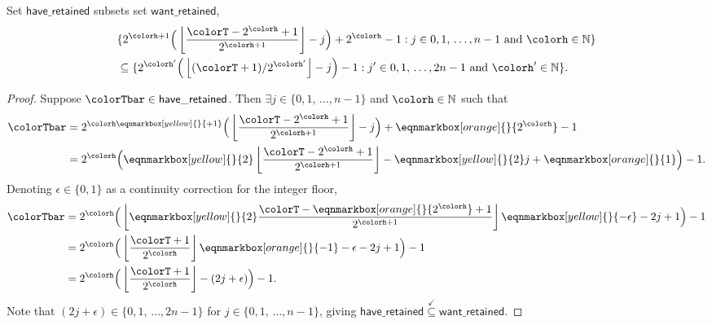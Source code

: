 \begin{sublemma}
\label{thm:tilted-rsubset}
Set $\mathsf{have\_retained}$ subsets set $\mathsf{want\_retained}$,
\begin{align*}
&\{
  2^{\colorh + 1}\Big( \left\lfloor\frac{\colorT - 2^{\colorh} + 1}{2^{\colorh + 1}} \right\rfloor - j\Big) + 2^{\colorh} - 1
  :
  j \in 0,1,\,\ldots,n-1
  \text{ and }
  \colorh \in \mathbb{N}
\}\\
&\subseteq
\{
  2^{\colorh'}\Big(\left\lfloor (\colorT + 1) / 2^{\colorh'} \right\rfloor - j\Big) - 1
  :
  j' \in 0,1,\,\ldots,2n-1
  \text{ and }
  \colorh' \in \mathbb{N}
\}.
\end{align*}
\end{sublemma}
\begin{proof}
Suppose $\colorTbar \in \mathsf{have\_retained}$.
Then $\exists j \in \{0,1,\,\ldots,n-1\}$ and $\colorh \in \mathbb{N}$ such that
\begin{align*}
\colorTbar
&= 2^{\colorh \eqnmarkbox[yellow]{}{+ 1}}\Big(\left\lfloor \frac{\colorT - 2^{\colorh} + 1}{2^{\colorh + 1}} \right\rfloor - j \Big) + \eqnmarkbox[orange]{}{2^{\colorh}} - 1\\
&= 2^{\colorh} \Big(\eqnmarkbox[yellow]{}{2}\left\lfloor \frac{\colorT - 2^{\colorh} + 1}{2^{\colorh + 1}} \right\rfloor  - \eqnmarkbox[yellow]{}{2}j + \eqnmarkbox[orange]{}{1} \Big) - 1.
\end{align*}
Denoting $\epsilon \in \{0, 1\}$ as a continuity correction for the integer floor,
\begin{align*}
\colorTbar
&= 2^{\colorh} \Big( \left\lfloor \eqnmarkbox[yellow]{}{2} \frac{\colorT - \eqnmarkbox[orange]{}{2^{\colorh}} + 1}{2^{\colorh+1}} \right\rfloor \eqnmarkbox[yellow]{}{- \epsilon}  - 2j + 1 \Big) - 1\\
&= 2^{\colorh} \Big( \left\lfloor \frac{\colorT + 1}{2^{\colorh}} \right\rfloor \eqnmarkbox[orange]{}{- 1} - \epsilon - 2j + 1 \Big) - 1\\
&= 2^{\colorh} \Big(\left\lfloor \frac{\colorT + 1}{2^{\colorh}}\right\rfloor - (2j + \epsilon) \Big) - 1.
\end{align*}
Note that $(2j + \epsilon) \in \{0,1,\,\ldots,2n-1\}$ for $j \in \{0,1,\,\ldots,n-1\}$, giving $\mathsf{have\_retained} \stackrel{\checkmark}{\subseteq} \mathsf{want\_retained}$.
\end{proof}

